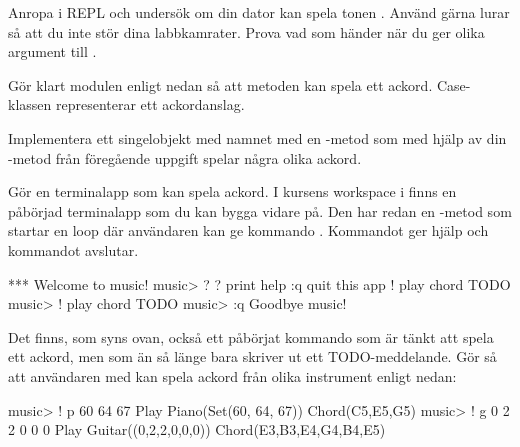 {\Task Anropa  i REPL och undersök om din dator kan spela tonen . Använd gärna lurar så att du inte stör dina labbkamrater. Prova vad som händer när du ger olika argument till .

\Task Gör klart modulen  enligt nedan så att metoden  kan spela ett ackord. Case-klassen  representerar ett ackordanslag.


\Task Implementera ett singelobjekt med namnet  med en -metod som med hjälp av din -metod från föregående uppgift spelar några olika ackord.





\Task Gör en terminalapp som kan spela ackord. I kursens workspace i  finns en påbörjad terminalapp som du kan bygga vidare på. Den har redan en -metod som startar en loop där användaren kan ge kommando . Kommandot  ger hjälp och kommandot  avslutar.

\begin{REPL}
*** Welcome to music!
music> ?
?         print help
:q        quit this app
!         play chord TODO
music> !
play chord TODO
music> :q
Goodbye music!
\end{REPL}

Det finns, som syns ovan, också ett påbörjat kommando \code{!} som är tänkt att spela ett ackord, men som än så länge bara skriver ut ett TODO-meddelande. Gör så att användaren med \code{!} kan spela ackord från olika instrument enligt nedan:

\begin{REPL}
music> ! p 60 64 67
Play Piano(Set(60, 64, 67)) Chord(C5,E5,G5)
music> ! g 0 2 2 0 0 0
Play Guitar((0,2,2,0,0,0)) Chord(E3,B3,E4,G4,B4,E5)
\end{REPL}

}
